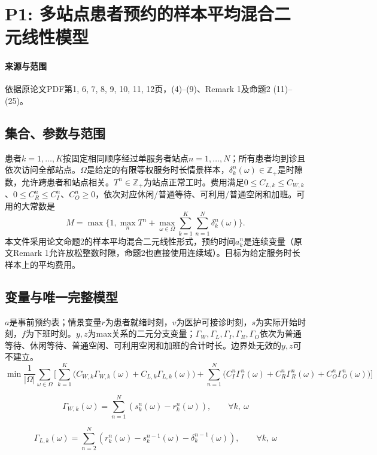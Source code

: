 \documentclass[UTF8,11pt]{ctexart}
\begin{document}
\section*{P1: 多站点患者预约的样本平均混合二元线性模型}
\paragraph{来源与范围}依据原论文PDF第1, 6, 7, 8, 9, 10, 11, 12页，(4)–(9)、Remark 1及命题2 (11)–(25)。
\subsection*{集合、参数与范围}
患者$k=1,\ldots,K$按固定相同顺序经过单服务者站点$n=1,\ldots,N$；所有患者均到诊且依次访问全部站点。$\Omega$是给定的有限等权服务时长情景样本，$\delta_k^n(\omega)\in\mathbb Z_+$是时隙数，允许跨患者和站点相关。$T^n\in\mathbb Z_+$为站点正常工时。费用满足$0\leq C_{L,k}\leq C_{W,k}$、$0\leq C_R^n\leq C_I^n$、$C_O^n\geq0$，依次对应休闲/普通等待、可利用/普通空闲和加班。可用的大常数是
\[
M=\max\{1,\max_nT^n+\max_{\omega\in\Omega}\sum_{k=1}^K\sum_{n=1}^N\delta_k^n(\omega)\}.
\]
本文件采用论文命题2的样本平均混合二元线性形式，预约时间$a_k^n$是连续变量（原文Remark 1允许放松整数时隙，命题2也直接使用连续域）。目标为给定服务时长样本上的平均费用。
\subsection*{变量与唯一完整模型}
$a$是事前预约表；情景变量$r$为患者就绪时刻，$v$为医护可接诊时刻，$s$为实际开始时刻，$f$为下班时刻。$y,z$为max关系的二元分支变量；$\Gamma_W,\Gamma_L,\Gamma_I,\Gamma_R,\Gamma_O$依次为普通等待、休闲等待、普通空闲、可利用空闲和加班的合计时长。边界处无效的$y,z$可不建立。
\begin{equation}
\min
\frac{1}{|\Omega|} \sum_{\omega \in \Omega}
\Big[
\sum_{k=1}^{K}
\big(
C_{W,k}\Gamma_{W,k}(\omega) + C_{L,k}\Gamma_{L,k}(\omega)
\big)
+ \sum_{n=1}^{N}
\big(
C_I^n\Gamma_I^n(\omega) + C_R^n\Gamma_R^n(\omega) + C_O^n\Gamma_O^n(\omega)
\big)
\Big]
\tag{MILP}
\end{equation}

\begin{equation}
\Gamma_{W,k}(\omega) =
\sum_{n=1}^{N} \left( s_k^n(\omega) - r_k^n(\omega) \right),
\qquad \forall k,\ \omega
\tag{10a}
\end{equation}

\begin{equation}
\Gamma_{L,k}(\omega) =
\sum_{n=2}^{N} \left( r_k^n(\omega) - s_k^{n-1}(\omega) - \delta_k^{n-1}(\omega) \right),
\qquad \forall k,\ \omega
\tag{10b}
\end{equation}
\end{document}
